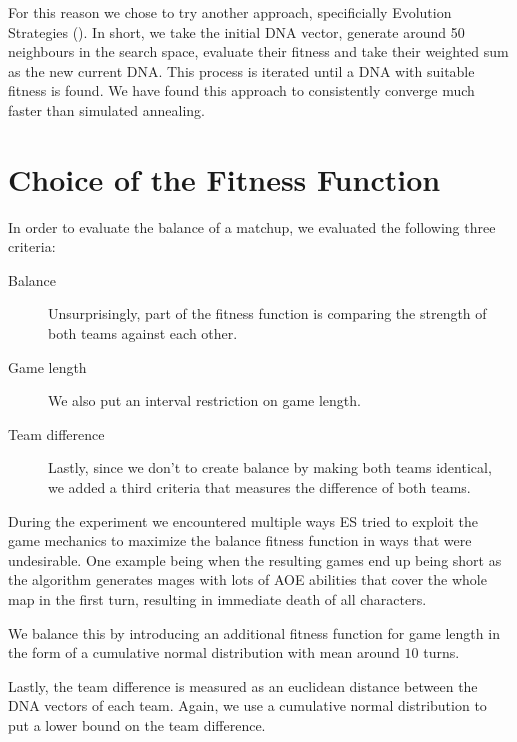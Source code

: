For this reason we chose to try another approach, specificially Evolution
Strategies (). In short, we take the initial DNA vector,
generate around 50 neighbours in the search space, evaluate their fitness
and take their weighted sum as the new current DNA\@. This process is iterated
until a DNA with suitable fitness is found. We have found this approach to
consistently converge much faster than simulated annealing.

\section{Choice of the Fitness Function}

In order to evaluate the balance of a matchup, we evaluated the following three criteria:

\begin{description}
\item [Balance] Unsurprisingly, part of the fitness function is comparing the strength of both teams against each other.
\item [Game length] We also put an interval restriction on game length.
\item [Team difference] Lastly, since we don't to create balance by making both teams identical, we added a third criteria
that measures the difference of both teams.
\end{description}

During the experiment we encountered multiple ways ES tried to exploit the
game mechanics to maximize the balance fitness function in ways that were
undesirable. One example being when the resulting games end up being short
as the algorithm generates mages with lots of AOE abilities that cover the
whole map in the first turn, resulting in immediate death of all characters.

We balance this by introducing an additional fitness function for game length
in the form of a cumulative normal distribution with mean around $10$ turns.

Lastly, the team difference is measured as an euclidean distance between the DNA
vectors of each team. Again, we use a cumulative normal distribution to put a lower
bound on the team difference.
